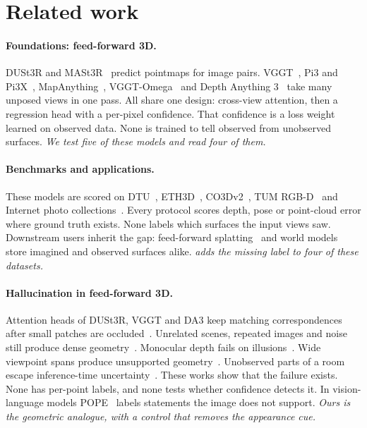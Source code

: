 \documentclass[10pt,twocolumn,letterpaper]{article}
\begin{document}
\section{Related work}
\label{sec:related}

\paragraph{Foundations: feed-forward 3D.}
DUSt3R and MASt3R~\cite{dust3r,mast3r} predict pointmaps for image pairs. VGGT~\cite{vggt}, Pi3 and Pi3X~\cite{pi3}, MapAnything~\cite{mapanything}, VGGT-Omega~\cite{vggtomega} and Depth Anything 3~\cite{da3} take many unposed views in one pass. All share one design: cross-view attention, then a regression head with a per-pixel confidence. That confidence is a loss weight learned on observed data. None is trained to tell observed from unobserved surfaces. \emph{We test five of these models and read four of them.}

\paragraph{Benchmarks and applications.}
These models are scored on DTU~\cite{dtu}, ETH3D~\cite{eth3d}, CO3Dv2~\cite{co3d}, TUM RGB-D~\cite{tum} and Internet photo collections~\cite{imc2020}. Every protocol scores depth, pose or point-cloud error where ground truth exists. None labels which surfaces the input views saw. Downstream users inherit the gap: feed-forward splatting~\cite{anysplat,reconsplat} and world models~\cite{l3gworld} store imagined and observed surfaces alike. \emph{\bench{} adds the missing label to four of these datasets.}

\paragraph{Hallucination in feed-forward 3D.}
Attention heads of DUSt3R, VGGT and DA3 keep matching correspondences after small patches are occluded~\cite{bratulic2025}. Unrelated scenes, repeated images and noise still produce dense geometry~\cite{paul2026}. Monocular depth fails on illusions~\cite{mirage}. Wide viewpoint spans produce unsupported geometry~\cite{widerviews}. Unobserved parts of a room escape inference-time uncertainty~\cite{sharperframes}. These works show that the failure exists. None has per-point labels, and none tests whether confidence detects it. In vision-language models POPE~\cite{pope} labels statements the image does not support. \emph{Ours is the geometric analogue, with a control that removes the appearance cue.}
\end{document}

